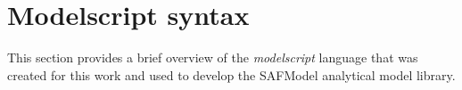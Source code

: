 \chapter{Modelscript syntax}
\label{appendix:modelscript}

This section provides a brief overview of the \textit{modelscript} language that was created for this work and used to develop the SAFModel analytical model library.

\clearpage
\newpage
